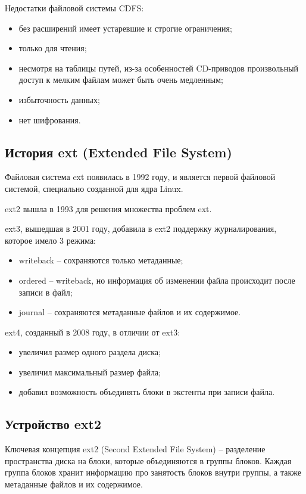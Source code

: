 Недостатки файловой системы CDFS:

\begin{itemize}
\item без расширений имеет устаревшие и строгие ограничения;
\item только для чтения;
\item несмотря на таблицы путей, из-за особенностей CD-приводов произвольный доступ к мелким файлам может быть очень медленным;
\item избыточность данных;
\item нет шифрования.
\end{itemize}

\subsection{История ext (Extended File System)}

Файловая система ext появилась в 1992 году, и является первой файловой системой, специально созданной для ядра Linux.

ext2 вышла в 1993 для решения множества проблем ext.

ext3, вышедшая в 2001 году, добавила в ext2 поддержку журналирования, которое имело 3 режима:

\begin{itemize}
\item writeback -- сохраняются только метаданные;
\item ordered -- writeback, но информация об изменении файла происходит после записи в файл;
\item journal -- сохраняются метаданные файлов и их содержимое.
\end{itemize}

ext4, созданный в 2008 году, в отличии от ext3:

\begin{itemize}
\item увеличил размер одного раздела диска;
\item увеличил максимальный размер файла;
\item добавил возможность объединять блоки в экстенты при записи файла.
\end{itemize}

\subsection{Устройство ext2}

Ключевая концепция ext2 (Second Extended File System) -- разделение пространства диска на блоки, которые объединяются в группы блоков.
Каждая группа блоков хранит информацию про занятость блоков внутри группы, а также метаданные файлов и их содержимое.

